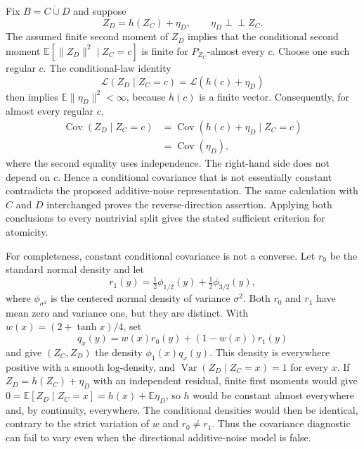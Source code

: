 Fix \(B=C\mathbin{\dot\cup}D\) and suppose
\[
 Z_D=h(Z_C)+\eta_D,
 \qquad \eta_D\perp\!\!\!\perp Z_C.
\]
The assumed finite second moment of \(Z_D\) implies that the conditional second moment \(\mathbb E[\|Z_D\|^2\mid Z_C=c]\) is finite for \(P_{Z_C}\)-almost every \(c\).  Choose one such regular \(c\).  The conditional-law identity
\[
 \mathcal L(Z_D\mid Z_C=c)=\mathcal L(h(c)+\eta_D)
\]
then implies \(\mathbb E\|\eta_D\|^2<\infty\), because \(h(c)\) is a finite vector.  Consequently, for almost every regular \(c\),
\[
 \begin{aligned}
 \operatorname{Cov}(Z_D\mid Z_C=c)
 &=\operatorname{Cov}(h(c)+\eta_D\mid Z_C=c)\\
 &=\operatorname{Cov}(\eta_D),
 \end{aligned}
\]
where the second equality uses independence.  The right-hand side does not depend on \(c\).  Hence a conditional covariance that is not essentially constant contradicts the proposed additive-noise representation.  The same calculation with \(C\) and \(D\) interchanged proves the reverse-direction assertion.  Applying both conclusions to every nontrivial split gives the stated sufficient criterion for atomicity.

For completeness, constant conditional covariance is not a converse.  Let \(r_0\) be the standard normal density and let
\[
 r_1(y)=\tfrac12\phi_{1/2}(y)+\tfrac12\phi_{3/2}(y),
\]
where \(\phi_{\sigma^2}\) is the centered normal density of variance \(\sigma^2\).  Both \(r_0\) and \(r_1\) have mean zero and variance one, but they are distinct.  With \(w(x)=(2+\tanh x)/4\), set
\[
 q_x(y)=w(x)r_0(y)+(1-w(x))r_1(y)
\]
and give \((Z_C,Z_D)\) the density \(\phi_1(x)q_x(y)\).  This density is everywhere positive with a smooth log-density, and \(\operatorname{Var}(Z_D\mid Z_C=x)=1\) for every \(x\).  If \(Z_D=h(Z_C)+\eta_D\) with an independent residual, finite first moments would give \(0=\mathbb E[Z_D\mid Z_C=x]=h(x)+\mathbb E\eta_D\), so \(h\) would be constant almost everywhere and, by continuity, everywhere.  The conditional densities would then be identical, contrary to the strict variation of \(w\) and \(r_0\neq r_1\).  Thus the covariance diagnostic can fail to vary even when the directional additive-noise model is false.